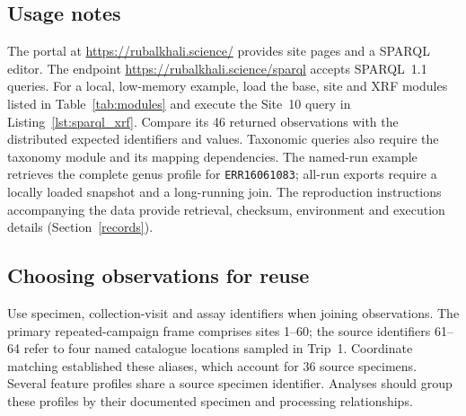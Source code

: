 \begin{revision}

\section{Usage notes}\label{usage}

The portal at \url{https://rubalkhali.science/} provides site pages and
a SPARQL editor. The endpoint
\url{https://rubalkhali.science/sparql} accepts SPARQL~1.1 queries.
For a local, low-memory example, load the base, site and XRF modules
listed in Table~\ref{tab:modules} and execute the Site~10 query in
Listing~\ref{lst:sparql_xrf}. Compare its 46 returned observations with
the distributed expected identifiers and values. Taxonomic queries also
require the taxonomy module and its mapping dependencies. The named-run
example retrieves the complete genus profile for \texttt{ERR16061083};
all-run exports require a locally loaded snapshot and a long-running join.
The reproduction instructions accompanying the data provide retrieval,
checksum, environment and execution details (Section~\ref{records}).

\subsection{Choosing observations for reuse}

Use specimen, collection-visit and assay identifiers when joining
observations. The primary repeated-campaign frame comprises sites
1--60; the source identifiers 61--64 refer to four named catalogue
locations sampled in Trip~1. Coordinate matching established these
aliases, which account for 36 source specimens. Several feature
profiles share a source specimen identifier. Analyses should group
these profiles by their documented specimen and processing relationships.


\end{revision}
